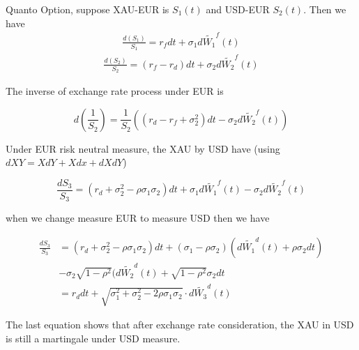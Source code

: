 \documentclass[11pt, oneside]{article}   	%
\begin{document}
\begin{exmp}
Quanto Option, suppose XAU-EUR is $S_1(t)$ and USD-EUR $S_2(t)$. Then we have
\begin{equation}
  \begin{aligned}
  \frac{d(S_1)}{S_1} = r_f dt + \sigma_1 d\widetilde{W_1}^f(t)
  \end{aligned}
\end{equation}
\begin{equation}
  \begin{aligned}
  \frac{d(S_2)}{S_2} = (r_f - r_d) dt + \sigma_2 d\widetilde{W_2}^f(t)
  \end{aligned}
\end{equation}

The inverse of exchange rate process under EUR is

\begin{equation}
d(\frac{1}{S_2}) = \frac{1}{S_2} ( (r_d - r_f + \sigma_2^2) dt - \sigma_2 d\widetilde{W_2}^f(t) )
\end{equation}

Under EUR risk neutral measure, the XAU by USD have (using $dXY = XdY + Xdx + dXdY$)

\begin{equation}
\frac{dS_3}{S_3} = (r_d + \sigma_2^2 - \rho\sigma_1\sigma_2) dt  + \sigma_1 d\widetilde{W_1}^f(t) - \sigma_2 d\widetilde{W_2}^f(t)
\end{equation}

when we change measure EUR to measure USD then we have

\begin{equation}
\begin{aligned}
\frac{dS_3}{S_3} &= (r_d + \sigma_2^2 - \rho\sigma_1\sigma_2) dt  + (\sigma_1 - \rho\sigma_2)(d\widetilde{W_1}^d(t) + \rho \sigma_2 dt) \\
                 &- \sigma_2 \sqrt{1 - \rho ^ 2} (d\widetilde{W_2}^d(t) + \sqrt{1 - \rho ^ 2} \sigma_2 dt\\
                 &= r_d dt + \sqrt{\sigma_1^2 + \sigma_2^2 - 2\rho \sigma_1 \sigma_2} \cdot d\widetilde{W_3}^d(t)
\end{aligned}
\end{equation}

The last equation shows that {\color{blue}after exchange rate consideration, the XAU in USD is still a martingale under USD measure.}

\end{exmp}
\end{document}
